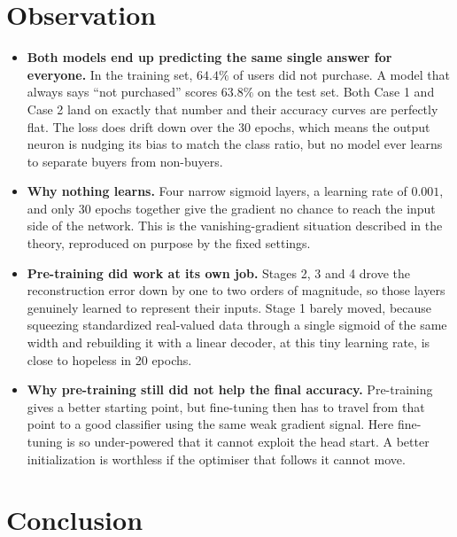 \documentclass[12pt]{article}
\begin{document}
\section{Observation}

\begin{itemize}
\item \textbf{Both models end up predicting the same single answer for
      everyone.} In the training set, $64.4\%$ of users did not purchase. A
      model that always says ``not purchased'' scores $63.8\%$ on the test set.
      Both Case 1 and Case 2 land on exactly that number and their accuracy
      curves are perfectly flat. The loss does drift down over the 30 epochs,
      which means the output neuron is nudging its bias to match the class
      ratio, but no model ever learns to separate buyers from non-buyers.
\item \textbf{Why nothing learns.} Four narrow sigmoid layers, a learning rate
      of $0.001$, and only 30 epochs together give the gradient no chance to
      reach the input side of the network. This is the vanishing-gradient
      situation described in the theory, reproduced on purpose by the fixed
      settings.
\item \textbf{Pre-training did work at its own job.} Stages 2, 3 and 4 drove the
      reconstruction error down by one to two orders of magnitude, so those
      layers genuinely learned to represent their inputs. Stage 1 barely moved,
      because squeezing standardized real-valued data through a single sigmoid
      of the same width and rebuilding it with a linear decoder, at this tiny
      learning rate, is close to hopeless in 20 epochs.
\item \textbf{Why pre-training still did not help the final accuracy.}
      Pre-training gives a better starting point, but fine-tuning then has to
      travel from that point to a good classifier using the same weak gradient
      signal. Here fine-tuning is so under-powered that it cannot exploit the
      head start. A better initialization is worthless if the optimiser that
      follows it cannot move.
\end{itemize}

\section{Conclusion}
\end{document}
